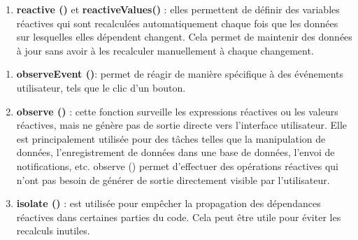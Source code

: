 \documentclass[
]{article}
\newenvironment{Shaded}{\begin{snugshade}}{\end{snugshade}}
\newcommand{\CommentTok}[1]{\textcolor[rgb]{0.56,0.35,0.01}{\textit{#1}}}
\newcommand{\ControlFlowTok}[1]{\textcolor[rgb]{0.13,0.29,0.53}{\textbf{#1}}}
\newcommand{\FunctionTok}[1]{\textcolor[rgb]{0.00,0.00,0.00}{#1}}
\newcommand{\NormalTok}[1]{#1}
\newcommand{\OtherTok}[1]{\textcolor[rgb]{0.56,0.35,0.01}{#1}}
\newcommand{\SpecialCharTok}[1]{\textcolor[rgb]{0.00,0.00,0.00}{#1}}
\providecommand{\tightlist}{%
  \setlength{\itemsep}{0pt}\setlength{\parskip}{0pt}}
\begin{document}
\begin{enumerate}
\def\labelenumi{\arabic{enumi}.}
\tightlist
\item
  \textbf{reactive ()} et \textbf{reactiveValues()} : elles permettent
  de définir des variables réactives qui sont recalculées
  automatiquement chaque fois que les données sur lesquelles elles
  dépendent changent. Cela permet de maintenir des données à jour sans
  avoir à les recalculer manuellement à chaque changement.
\end{enumerate}

\begin{Shaded}
\end{Shaded}

\begin{enumerate}
\def\labelenumi{\arabic{enumi}.}
\setcounter{enumi}{1}
\item
  \textbf{observeEvent ()}: permet de réagir de manière spécifique à des
  événements utilisateur, tels que le clic d'un bouton.
\item
  \textbf{observe ()} : cette fonction surveille les expressions
  réactives ou les valeurs réactives, mais ne génère pas de sortie
  directe vers l'interface utilisateur. Elle est principalement utilisée
  pour des tâches telles que la manipulation de données,
  l'enregistrement de données dans une base de données, l'envoi de
  notifications, etc. observe () permet d'effectuer des opérations
  réactives qui n'ont pas besoin de générer de sortie directement
  visible par l'utilisateur.
\item
  \textbf{isolate ()} : est utilisée pour empêcher la propagation des
  dépendances réactives dans certaines parties du code. Cela peut être
  utile pour éviter les recalculs inutiles.
\end{enumerate}

\newpage
\end{document}
